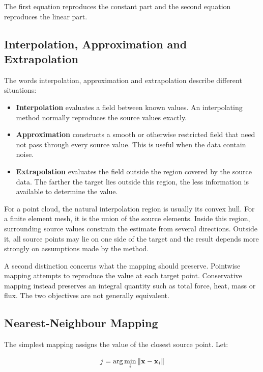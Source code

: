 The first equation reproduces the constant part and the second equation
reproduces the linear part.

\subsection{Interpolation, Approximation and Extrapolation}

The words interpolation, approximation and extrapolation describe different
situations:

\begin{itemize}
    \item \textbf{Interpolation} evaluates a field between known values. An
          interpolating method normally reproduces the source values exactly.
    \item \textbf{Approximation} constructs a smooth or otherwise restricted
          field that need not pass through every source value. This is useful
          when the data contain noise.
    \item \textbf{Extrapolation} evaluates the field outside the region covered
          by the source data. The farther the target lies outside this region,
          the less information is available to determine the value.
\end{itemize}

For a point cloud, the natural interpolation region is usually its convex
hull. For a finite element mesh, it is the union of the source elements.
Inside this region, surrounding source values constrain the estimate from
several directions. Outside it, all source points may lie on one side of the
target and the result depends more strongly on assumptions made by the method.

A second distinction concerns what the mapping should preserve. Pointwise
mapping attempts to reproduce the value at each target point. Conservative
mapping instead preserves an integral quantity such as total force, heat,
mass or flux. The two objectives are not generally equivalent.

\subsection{Nearest-Neighbour Mapping}

The simplest mapping assigns the value of the closest source point. Let:

\begin{equation}
    j = \arg\min_i \| {\mathbf{x}-\mathbf{x}_i} \|
\end{equation}


